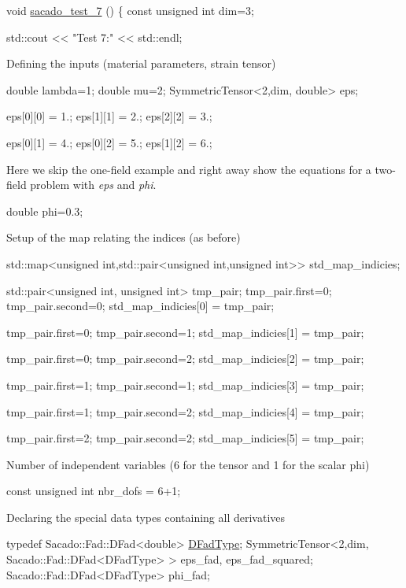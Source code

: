 \begin{DoxyCode}
\textcolor{keywordtype}{void} \hyperlink{Sacado__example_8cc_a0b694459e5e15c1578d97e637faba8de}{sacado\_test\_7} ()
\{
    \textcolor{keyword}{const} \textcolor{keywordtype}{unsigned} \textcolor{keywordtype}{int} dim=3;
 
    std::cout << \textcolor{stringliteral}{"Test 7:"} << std::endl;
\end{DoxyCode}
 Defining the inputs (material parameters, strain tensor) 
\begin{DoxyCode}
\textcolor{keywordtype}{double} lambda=1;
\textcolor{keywordtype}{double} mu=2;
SymmetricTensor<2,dim, double> eps;

eps[0][0] = 1.;
eps[1][1] = 2.;
eps[2][2] = 3.;

eps[0][1] = 4.;
eps[0][2] = 5.;
eps[1][2] = 6.;
\end{DoxyCode}
 Here we skip the one-\/field example and right away show the equations for a two-\/field problem with {\itshape eps} and {\itshape phi}. 
\begin{DoxyCode}
\textcolor{keywordtype}{double} phi=0.3;
\end{DoxyCode}
 Setup of the map relating the indices (as before) 
\begin{DoxyCode}
std::map<unsigned int,std::pair<unsigned int,unsigned int>> std\_map\_indicies;

std::pair<unsigned int, unsigned int> tmp\_pair;
tmp\_pair.first=0; tmp\_pair.second=0;
std\_map\_indicies[0] = tmp\_pair;

tmp\_pair.first=0; tmp\_pair.second=1;
std\_map\_indicies[1] = tmp\_pair;

tmp\_pair.first=0; tmp\_pair.second=2;
std\_map\_indicies[2] = tmp\_pair;

tmp\_pair.first=1; tmp\_pair.second=1;
std\_map\_indicies[3] = tmp\_pair;

tmp\_pair.first=1; tmp\_pair.second=2;
std\_map\_indicies[4] = tmp\_pair;

tmp\_pair.first=2; tmp\_pair.second=2;
std\_map\_indicies[5] = tmp\_pair;
\end{DoxyCode}
 Number of independent variables (6 for the tensor and 1 for the scalar phi) 
\begin{DoxyCode}
\textcolor{keyword}{const} \textcolor{keywordtype}{unsigned} \textcolor{keywordtype}{int} nbr\_dofs = 6+1;
\end{DoxyCode}
 Declaring the special data types containing all derivatives 
\begin{DoxyCode}
\textcolor{keyword}{typedef} Sacado::Fad::DFad<double> \hyperlink{Sacado__Wrapper_8h_a7e0893207b87dad05c66a34baac8ed2e}{DFadType};
SymmetricTensor<2,dim, Sacado::Fad::DFad<DFadType> > eps\_fad, eps\_fad\_squared;
Sacado::Fad::DFad<DFadType> phi\_fad;
\end{DoxyCode}
